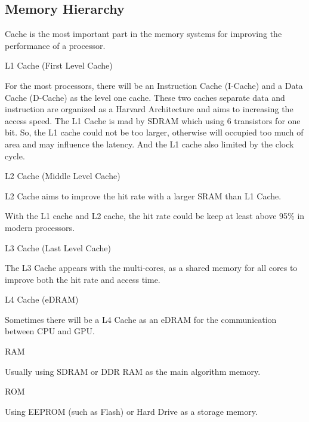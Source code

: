 \subsection{Memory Hierarchy}
\par Cache is the most important part in the memory systems for improving the performance of a processor\cite{goodman1983using}. 
\par L1 Cache (First Level Cache)
\par For the most processors, there will be an Instruction Cache (I-Cache) and a Data Cache (D-Cache) as the level one cache. These two caches separate data and instruction are organized as a Harvard Architecture and aims to increasing the access speed. The L1 Cache is mad by SDRAM which using 6 transistors for one bit\cite{hennessy2017computer}. So, the L1 cache could not be too larger, otherwise will occupied too much of area and may influence the latency. And the L1 cache also limited by the clock cycle\cite{hennessy2017computer}.
\par L2 Cache (Middle Level Cache)
\par L2 Cache aims to improve the hit rate with a larger SRAM than L1 Cache. 
\par With the L1 cache and L2 cache, the hit rate could be keep at least above 95\% in modern processors\cite{Hruska2017blog}. 
\par L3 Cache (Last Level Cache)
\par The L3 Cache appears with the multi-cores, as a shared memory for all cores to improve both the hit rate and access time. 
\par L4 Cache (eDRAM)
\par Sometimes there will be a L4 Cache as an eDRAM for the communication between CPU and GPU.
\par RAM
\par Usually using SDRAM or DDR RAM as the main algorithm memory.
\par ROM
\par Using EEPROM (such as Flash) or Hard Drive as a storage memory.
